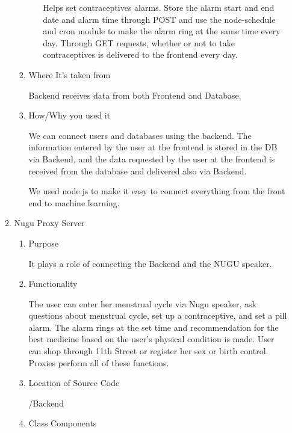 \documentclass[conference]{IEEEtran}
\begin{document}
\begin{itemize}
\begin{enumerate}
\begin{enumerate}
\begin{itemize}
                \setlength{\parindent}{2ex} Helps set contraceptives alarms. Store the alarm start and end date and alarm time through POST and use the node-schedule and cron module to make the alarm ring at the same time every day. Through GET requests, whether or not to take contraceptives is delivered to the frontend every day.
                
            \end{itemize}
            \item Where It's taken from
            
           \setlength{\parindent}{2ex} Backend receives data from both Frontend and Database.
            \item How/Why you used it
            
           \setlength{\parindent}{2ex} We can connect users and databases using the backend. The information entered by the user at the frontend is stored in the DB via Backend, and the data requested by the user at the frontend is received from the database and delivered also via Backend. 
           
            \setlength{\parindent}{2ex} We used node.js to make it easy to connect everything from the front end to machine learning.
        \end{enumerate}
        
        \item Nugu Proxy Server
        \begin{enumerate}
            \item Purpose
            
            \setlength{\parindent}{2ex} It plays a role of connecting the Backend and the NUGU speaker. 
            \item Functionality
            
            \setlength{\parindent}{2ex} The user can enter her menstrual cycle via Nugu speaker, ask questions about menstrual cycle, set up a contraceptive, and set a pill alarm. The alarm rings at the set time and recommendation for the best medicine based on the user's physical condition is made. User can shop through 11th Street or register her sex or birth control. Proxies perform all of these functions.
            
            \item Location of Source Code
            
            /Backend
            
            \item Class Components
            

\end{enumerate}
\end{enumerate}
\end{itemize}
\end{document}

